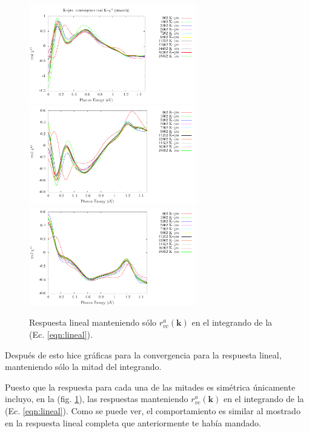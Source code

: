 \documentclass[11pt]{article}
\begin{document}
\begin{figure}
	\begin{center}
		\includegraphics[width=0.65\textwidth]{./figures/boat/res1_chi_posMatElemen1_1_sm}\\
		\includegraphics[width=0.65\textwidth]{./figures/boat/res1_chi_posMatElemen1_2_sm}\\
		\includegraphics[width=0.65\textwidth]{./figures/boat/res1_chi_posMatElemen1_3_sm}
	\end{center}
	\caption{Respuesta lineal manteniendo s\'olo $r^{a}_{vc}(\textbf{k})$ en el integrando de la (Ec. \ref{eqn:lineal}). }
	\label{fig:lineal_posMatElemen1}
\end{figure}


Despu\'es de esto hice gr\'aficas para la convergencia para la respuesta lineal, manteniendo s\'olo la mitad del integrando. 

Puesto que la respuesta para cada una de las mitades es sim\'etrica \'unicamente incluyo, en la (fig. \ref{fig:lineal_posMatElemen1}), las respuestas manteniendo $r^{a}_{vc}(\textbf{k})$ en el integrando de la (Ec. \ref{eqn:lineal}). Como se puede ver, el comportamiento es similar al mostrado en la respuesta lineal completa que anteriormente te hab\'ia mandado.
\end{document}

